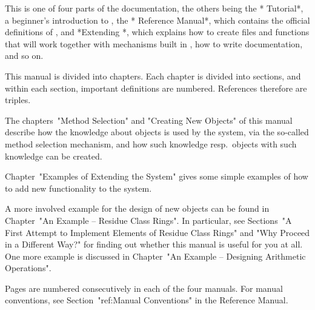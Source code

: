 
This is one of four parts of the {\GAP} documentation,
the others being
the *{\GAP} Tutorial*, a beginner's introduction to {\GAP},
the *{\GAP} Reference Manual*,
which contains the official definitions of {\GAP},
and *Extending {\GAP}*,
which explains how to create files and functions that will work
together with mechanisms built in {\GAP}, how to write documentation,
and so on.

This manual is divided into chapters.
Each chapter is divided into sections,
and within each section, important definitions are numbered.
References therefore are triples.

The chapters~"Method Selection" and "Creating New Objects" of this manual
describe how the knowledge about {\GAP} objects is used by the system,
via the so-called method selection mechanism,
and how such knowledge resp.~objects with such knowledge can be created.

Chapter~"Examples of Extending the System" gives some simple examples of how
to add new functionality to the system.

A more involved example for the design of new {\GAP} objects can be found in
Chapter~"An Example -- Residue Class Rings".
In particular,
see Sections~"A First Attempt to Implement Elements of Residue Class Rings"
and "Why Proceed in a Different Way?"
for finding out whether this manual is useful for you at all.
One more example is discussed in
Chapter~"An Example -- Designing Arithmetic Operations".

Pages are numbered consecutively in each of the four manuals.
For manual conventions, see Section~"ref:Manual Conventions"
in the Reference Manual.



